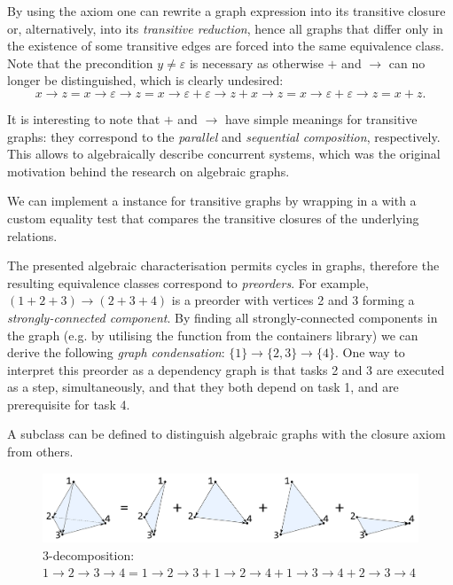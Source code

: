 By using the axiom one can rewrite a graph expression into its transitive closure or,
alternatively, into its \emph{transitive reduction}, hence all graphs that differ only in the
existence of some transitive edges are forced into the same equivalence class. Note that the
precondition $y \neq \varepsilon$ is necessary as otherwise $+$ and $\rightarrow$ can no
longer be distinguished, which is clearly undesired:
\[
x \rightarrow z = x \rightarrow \varepsilon \rightarrow z = x \rightarrow \varepsilon
 + \varepsilon \rightarrow z + x \rightarrow z = x \rightarrow \varepsilon
 + \varepsilon \rightarrow z = x + z.
\]

It is interesting to note that $+$ and $\rightarrow$ have simple meanings for transitive
graphs: they correspond to the \emph{parallel} and \emph{sequential composition},
respectively. This allows to algebraically describe concurrent systems, which was
the original motivation behind the research on algebraic graphs.

We can implement a  instance for transitive graphs by wrapping
 in a  with a custom equality test that
compares the transitive closures of the underlying relations.

The presented algebraic characterisation permits cycles in graphs, therefore the
resulting equivalence classes correspond to \emph{preorders}. For example,
$(1 + 2 + 3) \rightarrow (2 + 3 + 4)$
is a preorder with vertices 2 and 3 forming a \emph{strongly-connected component}. By
finding all strongly-connected components in the graph (e.g. by utilising the
function  from the \textsf{containers} library) we can derive the
following \emph{graph condensation}:
$\{1\} \rightarrow \{2, 3\} \rightarrow \{4\}$. One way to interpret this preorder as a
dependency graph is that tasks 2 and 3 are executed as a step,
simultaneously, and that they both depend on task 1, and are prerequisite for task 4.

A subclass  can be defined to distinguish
algebraic graphs with the closure axiom from others.

\begin{figure}
\centerline{\includegraphics[scale=0.105]{fig/3-decomposition.pdf}}
\caption{3-decomposition:
    $1 \rightarrow 2 \rightarrow 3 \rightarrow 4 =
    1 \rightarrow 2 \rightarrow 3 + 1 \rightarrow 2 \rightarrow 4 +
    1 \rightarrow 3 \rightarrow 4 + 2 \rightarrow 3 \rightarrow 4$
    \label{fig-3-decomposition}}
\end{figure}

